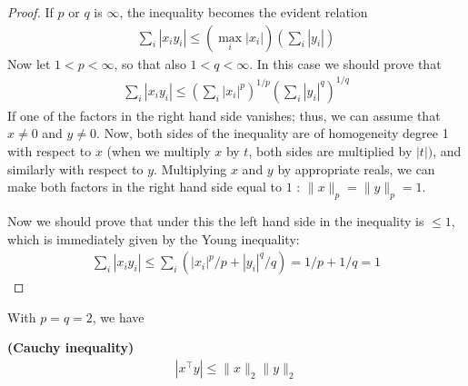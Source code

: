 \documentclass{article}
\newcommand{\bfs}[1]{\textbf{({#1}) }}
\begin{document}
\begin{proof}\color{ForestGreen}
If $p$ or $q$ is $\infty$,  the inequality becomes the evident relation
\begin{align*}
\sum_{i}\left|x_{i} y_{i}\right| \leq\left(\max _{i}\left|x_{i}\right|\right)\left(\sum_{i}\left|y_{i}\right|\right)
\end{align*}
Now let $1<p<\infty$, so that also $1<q<\infty$. In this case we should prove that
\begin{align*}
\sum_{i}\left|x_{i} y_{i}\right| \leq\left(\sum_{i}\left|x_{i}\right|^{p}\right)^{1 / p}\left(\sum_{i}\left|y_{i}\right|^{q}\right)^{1 / q}
\end{align*}
If one of the factors in the right hand side vanishes; thus, we can assume that $x \neq 0$ and $y \neq 0$. Now, both sides of the inequality are of homogeneity degree 1 with respect to $x$ (when we multiply $x$ by $t$, both sides are multiplied by $|t|)$, and similarly with respect to $y$. Multiplying $x$ and $y$ by appropriate reals, we can make both factors in the right hand side equal to $1$ : $\|x\|_{p}=\|y\|_{p}=1$. 

Now we should prove that under this  the left hand side in the inequality is $\leq 1$, which is immediately given by the Young inequality:
\begin{align*}
\sum_{i}\left|x_{i} y_{i}\right| \leq \sum_{i}\left(\left|x_{i}\right|^{p} / p+\left|y_{i}\right|^{q} / q\right)=1 / p+1 / q=1
\end{align*}
\end{proof}
With $p=q=2$, we have
\begin{cora}\bfs{Cauchy inequality}
 \begin{align*}
\left|x^{\top} y\right| \leq\|x\|_{2}\|y\|_{2}
\end{align*}
\end{cora}
\end{document}
